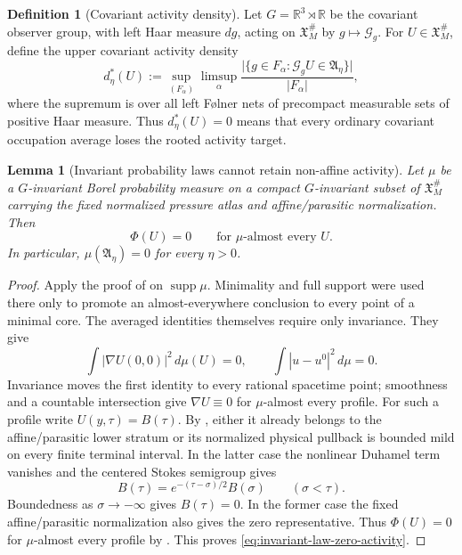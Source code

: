 \documentclass[11pt]{amsart}
\numberwithin{equation}{section}
\theoremstyle{plain}
\newtheorem{lemma}[lemma]{Lemma}
\theoremstyle{definition}
\newtheorem{definition}[definition]{Definition}
\theoremstyle{remark}
\begin{document}
\begin{definition}[Covariant activity density]
\label{def:covariant-activity-density}
Let \(G=\mathbb R^3\rtimes\mathbb R\) be the covariant observer group, with
left Haar measure \(dg\), acting on \(\mathfrak X_M^\#\) by
\(g\mapsto\mathscr G_g\).  For \(U\in\mathfrak X_M^\#\), define the upper
covariant activity density
\begin{equation}\label{eq:upper-covariant-activity-density}
 d_\eta^*(U):=\sup_{(F_\alpha)}\limsup_\alpha
 \frac{\bigl|\{g\in F_\alpha:\mathscr G_gU\in\mathfrak A_\eta\}\bigr|}
 {|F_\alpha|},
\end{equation}
where the supremum is over all left F\o lner nets of precompact measurable
sets of positive Haar measure.  Thus \(d_\eta^*(U)=0\) means that every
ordinary covariant occupation average loses the rooted activity target.
\end{definition}

\begin{lemma}[Invariant probability laws cannot retain non-affine activity]
\label{lem:invariant-active-law-rigidity}
Let \(\mu\) be a \(G\)-invariant Borel probability measure on a compact
\(G\)-invariant subset of \(\mathfrak X_M^\#\) carrying the fixed normalized
pressure atlas and affine/parasitic normalization.  Then
\begin{equation}\label{eq:invariant-law-zero-activity}
 \Phi(U)=0\qquad\text{for \(\mu\)-almost every }U.
\end{equation}
In particular, \(\mu(\mathfrak A_\eta)=0\) for every \(\eta>0\).
\end{lemma}

\begin{proof}
Apply the proof of  on
\(\operatorname{supp}\mu\).  Minimality and full support were used there only
to promote an almost-everywhere conclusion to every point of a minimal core.
The averaged identities themselves require only invariance.  They give
\[
 \int |\nabla U(0,0)|^2\,d\mu(U)=0,
 \qquad
 \int |u-u^0|^2\,d\mu=0.
\]
Invariance moves the first identity to every rational spacetime point; smoothness
and a countable intersection give \(\nabla U\equiv0\) for \(\mu\)-almost
every profile.  For such a profile write \(U(y,\tau)=B(\tau)\).
By , either it already belongs to the
affine/parasitic lower stratum or its normalized physical pullback is bounded
mild on every finite terminal interval.  In the latter case the nonlinear
Duhamel term vanishes and the centered Stokes semigroup gives
\[
 B(\tau)=e^{-(\tau-\sigma)/2}B(\sigma)
 \qquad(\sigma<\tau).
\]
Boundedness as \(\sigma\to-\infty\) gives \(B(\tau)=0\).  In the former case
the fixed affine/parasitic normalization also gives the zero representative.
Thus \(\Phi(U)=0\) for \(\mu\)-almost every profile by
.  This proves
\eqref{eq:invariant-law-zero-activity}.
\end{proof}
\end{document}
